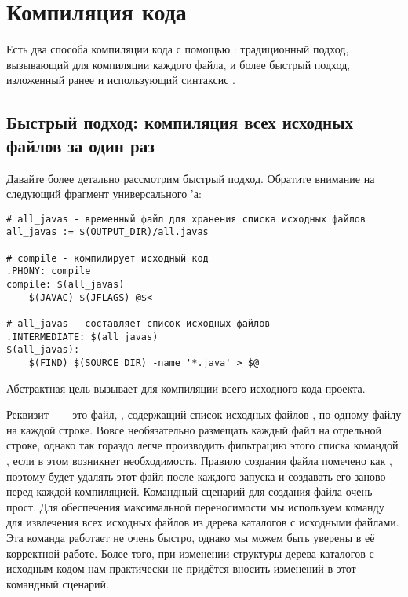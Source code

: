 \section{Компиляция \Java{} кода}

Есть два способа компиляции кода \Java{} с помощью \GNUmake{}:
традиционный подход, вызывающий  для компиляции каждого
файла, и более быстрый подход, изложенный ранее и использующий
синтаксис .

\subsection*{Быстрый подход: компиляция всех исходных файлов за один
раз} \label{sec:all_in_one_compile}

Давайте более детально рассмотрим быстрый подход. Обратите внимание на
следующий фрагмент универсального \Makefile{}'а:

{\footnotesize
\begin{verbatim}
# all_javas - временный файл для хранения списка исходных файлов
all_javas := $(OUTPUT_DIR)/all.javas

# compile - компилирует исходный код
.PHONY: compile
compile: $(all_javas)
    $(JAVAC) $(JFLAGS) @$<

# all_javas - составляет список исходных файлов
.INTERMEDIATE: $(all_javas)
$(all_javas):
    $(FIND) $(SOURCE_DIR) -name '*.java' > $@
\end{verbatim}
}

Абстрактная цель  вызывает  для
компиляции всего исходного кода проекта.

Реквизит ~--- это файл, ,
содержащий список исходных файлов \Java{}, по одному файлу на каждой
строке. Вовсе необязательно размещать каждый файл на отдельной строке,
однако так гораздо легче производить фильтрацию этого списка командой
, если в этом возникнет необходимость. Правило создания
файла  помечено как ,
поэтому \GNUmake{} будет удалять этот файл после каждого запуска и
создавать его заново перед каждой компиляцией. Командный сценарий для
создания файла очень прост. Для обеспечения максимальной переносимости
мы используем команду  для извлечения всех исходных
файлов \Java{} из дерева каталогов с исходными файлами. Эта команда
работает не очень быстро, однако мы можем быть уверены в её корректной
работе. Более того, при изменении структуры дерева каталогов с
исходным кодом нам практически не придётся вносить изменений в этот
командный сценарий.

